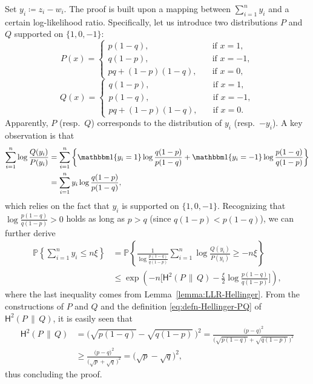 Set  $y_i\coloneqq z_i - w_i$. The proof is built upon a mapping between $\sum_{i=1}^{n}y_{i}$ and a certain log-likelihood ratio. 
Specifically, let us introduce two distributions $P$ and $Q$ supported on $\{1,0,-1\}$:
%
\[
P(x)=\begin{cases}
p(1-q),\quad & \text{if }x=1,\\
q(1-p), & \text{if }x=-1,\\
pq+(1-p)(1-q), \quad & \text{if }x=0,
\end{cases} 
\]
% 
%
\[
Q(x)=\begin{cases}
q(1-p),\quad & \text{if }x=1,\\
p(1-q), & \text{if }x=-1,\\
pq+(1-p)(1-q), \quad & \text{if }x=0.
\end{cases}
\]
%
Apparently, $P$ (resp.~$Q$) corresponds to the distribution of $y_i$ (resp.~$-y_i$).  A key observation is that
%
\begin{align*}
\sum_{i=1}^{n}\log\frac{Q(y_{i})}{P(y_{i})} & =\sum_{i=1}^{n}\left\{ \mathbbm1\{y_{i}=1\}\log\frac{q(1-p)}{p(1-q)}+\mathbbm1\{y_{i}=-1\}\log\frac{p(1-q)}{q(1-p)}\right\} \\
 & =\sum_{i=1}^{n}y_{i}\log\frac{q(1-p)}{p(1-q)} ,
\end{align*}
%
which relies on the fact that $y_i$ is supported on $\{1,0,-1\}$. 
Recognizing that $\log\frac{p(1-q)}{q(1-p)}>0$ holds as long as
$p>q$ (since $q(1-p)<p(1-q)$), we can further derive
%
\begin{align*}
\mathbb{P}\left\{ \sum_{i=1}^{n}y_{i}\leq n\xi\right\}  & =\mathbb{P}\left\{ \frac{1}{\log\frac{p(1-q)}{q(1-p)}}\sum_{i=1}^{n}\log\frac{Q(y_{i})}{P(y_{i})}\geq-n\xi\right\} \\
 & \leq\exp\left(-n\Big[\mathsf{H}^2(P\,\|\,Q)-\frac{\xi}{2}\log\frac{p(1-q)}{q(1-p)}\Big]\right),
\end{align*}
%
where the last inequality comes from Lemma~\ref{lemma:LLR-Hellinger}. 
From the constructions of $P$ and $Q$ and the definition \eqref{eq:defn-Hellinger-PQ} of $\mathsf{H}^2(P\,\|\,Q)$, it is easily seen that 
%
\begin{align*}
\mathsf{H}^{2}(P\,\|\,Q) & =\Big(\sqrt{p(1-q)}-\sqrt{q(1-p)}\,\Big)^{2}
	= \frac{\big(p-q\big)^{2}}{\big(\sqrt{p(1-q)}+\sqrt{q(1-p)}\,\big)^{2}}\\
 & \geq\frac{\big(p-q\big)^{2}}{\big(\sqrt{p}+\sqrt{q}\,\big)^{2}}=\big(\sqrt{p}-\sqrt{q}\big)^{2} ,
\end{align*}
%
thus concluding the proof. 






